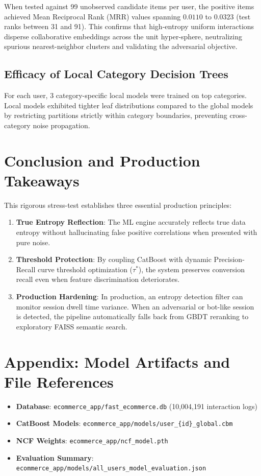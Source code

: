 \documentclass[11pt,a4paper]{article}
\begin{document}
When tested against 99 unobserved candidate items per user, the positive items achieved Mean Reciprocal Rank (MRR) values spanning $0.0110$ to $0.0323$ (test ranks between 31 and 91). This confirms that high-entropy uniform interactions disperse collaborative embeddings across the unit hyper-sphere, neutralizing spurious nearest-neighbor clusters and validating the adversarial objective.

\subsection{Efficacy of Local Category Decision Trees}
For each user, 3 category-specific local models were trained on top categories. Local models exhibited tighter leaf distributions compared to the global models by restricting partitions strictly within category boundaries, preventing cross-category noise propagation.

\section{Conclusion and Production Takeaways}
This rigorous stress-test establishes three essential production principles:
\begin{enumerate}
    \item \textbf{True Entropy Reflection}: The ML engine accurately reflects true data entropy without hallucinating false positive correlations when presented with pure noise.
    \item \textbf{Threshold Protection}: By coupling CatBoost with dynamic Precision-Recall curve threshold optimization ($\tau^*$), the system preserves conversion recall even when feature discrimination deteriorates.
    \item \textbf{Production Hardening}: In production, an entropy detection filter can monitor session dwell time variance. When an adversarial or bot-like session is detected, the pipeline automatically falls back from GBDT reranking to exploratory FAISS semantic search.
\end{enumerate}

\section*{Appendix: Model Artifacts and File References}
\begin{itemize}
    \item \textbf{Database}: \texttt{ecommerce\_app/fast\_ecommerce.db} (10,004,191 interaction logs)
    \item \textbf{CatBoost Models}: \texttt{ecommerce\_app/models/user\_\{id\}\_global.cbm}
    \item \textbf{NCF Weights}: \texttt{ecommerce\_app/ncf\_model.pth}
    \item \textbf{Evaluation Summary}: \texttt{ecommerce\_app/models/all\_users\_model\_evaluation.json}
\end{itemize}
\end{document}
